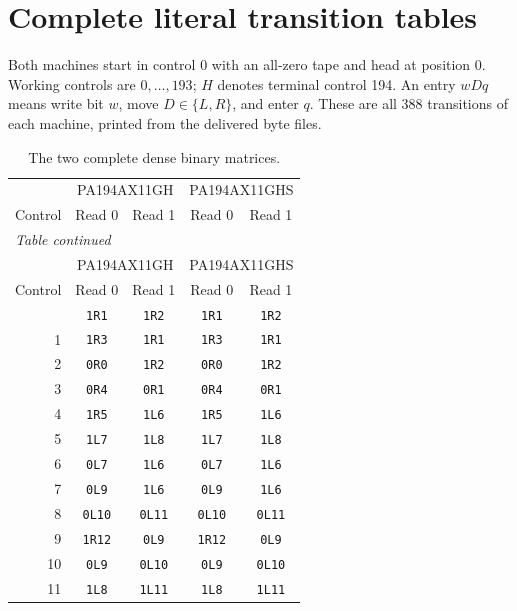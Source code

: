 \section{Complete literal transition tables}
\label{app:literal-tables}
Both machines start in control 0 with an all-zero tape and head at position 0.
Working controls are $0,\ldots,193$; $H$ denotes terminal control 194.
An entry $wDq$ means write bit $w$, move $D\in\{L,R\}$, and enter $q$.
These are all 388 transitions of each machine, printed from the delivered byte files.
\begingroup\small\renewcommand{\arraystretch}{1.08}
\begin{longtable}{rcccc}
\caption{The two complete dense binary matrices.}\label{tab:complete-matrices}\\
\toprule & \multicolumn{2}{c}{PA194AX11GH} & \multicolumn{2}{c}{PA194AX11GHS}\\
Control & Read 0 & Read 1 & Read 0 & Read 1\\\midrule\endfirsthead
\multicolumn{5}{l}{\emph{Table \thetable{} continued}}\\
\toprule & \multicolumn{2}{c}{PA194AX11GH} & \multicolumn{2}{c}{PA194AX11GHS}\\
Control & Read 0 & Read 1 & Read 0 & Read 1\\\midrule\endhead
\bottomrule\endfoot
0 & \texttt{1R1} & \texttt{1R2} & \texttt{1R1} & \texttt{1R2} \\
1 & \texttt{1R3} & \texttt{1R1} & \texttt{1R3} & \texttt{1R1} \\
2 & \texttt{0R0} & \texttt{1R2} & \texttt{0R0} & \texttt{1R2} \\
3 & \texttt{0R4} & \texttt{0R1} & \texttt{0R4} & \texttt{0R1} \\
4 & \texttt{1R5} & \texttt{1L6} & \texttt{1R5} & \texttt{1L6} \\
5 & \texttt{1L7} & \texttt{1L8} & \texttt{1L7} & \texttt{1L8} \\
6 & \texttt{0L7} & \texttt{1L6} & \texttt{0L7} & \texttt{1L6} \\
7 & \texttt{0L9} & \texttt{1L6} & \texttt{0L9} & \texttt{1L6} \\
8 & \texttt{0L10} & \texttt{0L11} & \texttt{0L10} & \texttt{0L11} \\
9 & \texttt{1R12} & \texttt{0L9} & \texttt{1R12} & \texttt{0L9} \\
10 & \texttt{0L9} & \texttt{0L10} & \texttt{0L9} & \texttt{0L10} \\
11 & \texttt{1L8} & \texttt{1L11} & \texttt{1L8} & \texttt{1L11} \\

\end{longtable}
